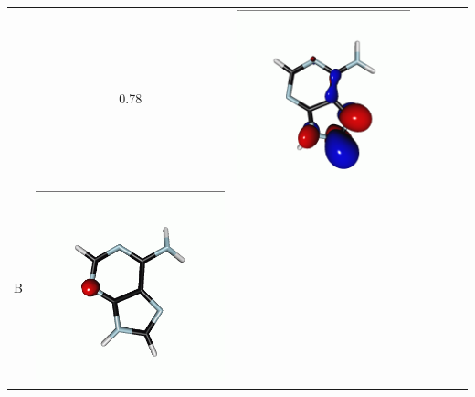 \documentclass[journal=jctcce,manuscript=article]{achemso}
\begin{document}
\begin{table}[H]
\begin{tabular}{ l | c c c | c c c }
\begin{minipage}{0.2\textwidth}
    \end{minipage}
    & 0.78 & 
    \begin{minipage}{0.2\textwidth}
        \centering
        \includegraphics[scale=0.10]{NTO/Adenine_N/1p_Cs.png}
    \end{minipage}
    \\
        B &  
    \begin{minipage}{0.2\textwidth}
        \centering
        \includegraphics[scale=0.10]{NTO/Adenine_N/2h_C1.png}

\end{minipage}
\end{tabular}
\end{table}
\end{document}

